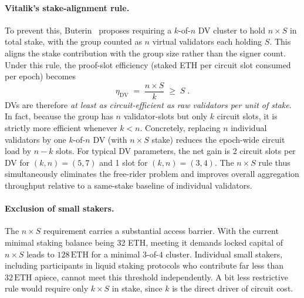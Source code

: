 \documentclass[11pt,a4paper]{article}
\begin{document}
\paragraph{Vitalik's stake-alignment rule.}
To prevent this, Buterin~\cite{native-dvt} proposes requiring a $k$-of-$n$ DV cluster to hold $n \times S$ in total stake, with the group counted as $n$ virtual validators each holding $S$.
This aligns the stake contribution with the group size rather than the signer count.
Under this rule, the proof-slot efficiency (staked ETH per circuit slot consumed per epoch) becomes
\[
  \eta_{\mathrm{DV}} \;=\; \frac{n \times S}{k} \;\geq\; S \;.
\]
DVs are therefore \emph{at least as circuit-efficient as raw validators per unit of stake}.
In fact, because the group has $n$ validator-slots but only $k$ circuit slots, it is strictly more efficient whenever $k < n$.
Concretely, replacing $n$ individual validators by one $k$-of-$n$ DV (with $n \times S$ stake) reduces the epoch-wide circuit load by $n - k$ slots.
For typical DV parameters, the net gain is 2 circuit slots per DV for $(k,n)=(5,7)$ and 1 slot for $(k,n)=(3,4)$.
The $n \times S$ rule thus simultaneously eliminates the free-rider problem and improves overall aggregation throughput relative to a same-stake baseline of individual validators.

\paragraph{Exclusion of small stakers.}
The $n \times S$ requirement carries a substantial access barrier.
With the current minimal staking balance being 32 ETH, meeting it demands locked capital of $n \times S$ leads to $128\,\mathrm{ETH}$ for a minimal $3$-of-$4$ cluster.
Individual small stakers, including participants in liquid staking protocols who contribute far less than $32\,\mathrm{ETH}$ apiece, cannot meet this threshold independently.
A bit less restrictive rule would require only $k \times S$ in stake, since $k$ is the direct driver of circuit cost.



\end{document}
